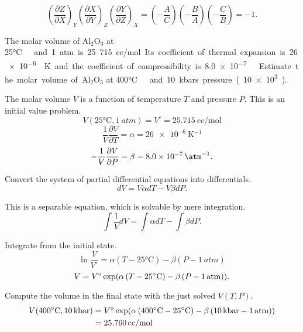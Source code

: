 \begin{@empty}
\begin{answer}
    \[
        \left( \frac{\partial Z}{\partial X} \right)_Y
        \left( \frac{\partial X}{\partial Y} \right)_Z
        \left( \frac{\partial Y}{\partial Z} \right)_X
        = \left( -\frac AC \right)
          \left( -\frac BA \right)
          \left( -\frac CB \right)
        = -1.
    \]
\end{answer}

\begin{problem}
    The molar volume of Al$_2$O$_3$ at 25\si\celsius\ and 1 atm is 25.715
    cc/mol.  Its coefficient of thermal expansion is \SI{26e-6}{\per\kelvin}
    and the coefficient of compressibility is \SI{8.0e-7}{\per\atm}.  Estimate
    the molar volume of Al$_2$O$_3$ at 400\si\celsius\ and 10 kbars pressure
    (\SI{10e3}{\atm}).
\end{problem}

\begin{answer}
    The molar volume $V$ is a function of temperature $T$ and pressure $P$.
    This is an initial value problem.
    \[ V(25\si\celsius, \SI{1}{atm}) = V^\circ = \SI{25.715}{cc/\mol} \]
    \[ \frac1V \frac{\partial V}{\partial T} = \alpha = \SI{26e-6}{\kelvin^{-1}} \]
    \[ -\frac1V \frac{\partial V}{\partial P} = \beta = \SI{8.0e-7}{\atm^{-1}}.\]

    Convert the system of partial differential equations into differentials.
    \[ dV = V \alpha dT - V \beta dP.\]

    This is a separable equation, which is solvable by mere integration.
    \[ \int \frac1V dV = \int \alpha dT - \int \beta dP.\]

    Integrate from the initial state.
    \[ \ln \frac{V}{V^\circ} = \alpha \left( T - 25\si\celsius \right) - \beta \left( P - \SI{1}{atm} \right) \]
    \[ V = V^\circ \exp \Left( \alpha \left( T - 25\si\celsius \right) - \beta \left( P - \SI{1}{atm} \right) \Right).\]

    Compute the volume in the final state with the just solved $V(T, P)$.
    \begin{align*}
        V(400\si\celsius, \SI{10}{\kilo\bar})
        &= V^\circ \exp \Left(
            \alpha \left( 400\si\celsius - 25\si\celsius \right)
            - \beta \left( \SI{10}{\kilo\bar} - \SI{1}{atm} \right) \Right) \\
        &= \SI{25.760}{cc/\mol}
    \end{align*}
\end{answer}

\begin{problem}
\end{problem}


\end{@empty}
